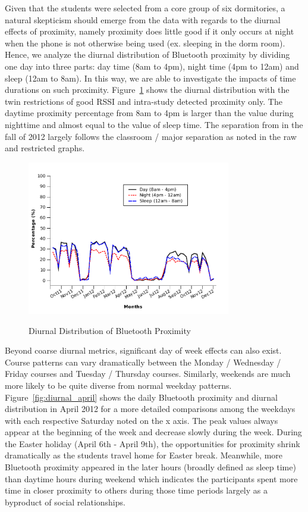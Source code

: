 Given that the students were selected from a core group of six dormitories, a natural skepticism should emerge from the data with regards to the diurnal effects of proximity, namely proximity does little good if it only occurs at night when the phone is not otherwise being used (ex. sleeping in the dorm room).  Hence, we analyze the diurnal distribution of Bluetooth proximity by dividing one day into three parts: day time (8am to 4pm), night time (4pm to 12am) and sleep (12am to 8am). In this way, we are able to investigate the impacts of time durations on such proximity. Figure~\ref{fig:diurnal} shows the diurnal distribution with the twin restrictions of good RSSI and intra-study detected proximity only. The daytime proximity percentage from 8am to 4pm is larger than the value during nighttime and almost equal to the value of sleep time.  The separation from in the fall of 2012 largely follows the classroom / major separation as noted in the raw and restricted graphs. 

\begin{figure}[tbp]
\centering 
{\includegraphics[width=3.5in]{graphs/weekly_bluetooth_diurnal.pdf}}
 \caption{Diurnal Distribution of Bluetooth Proximity} 
\label{fig:diurnal}
\end{figure} 

Beyond coarse diurnal metrics, significant day of week effects can also exist. Course patterns can vary dramatically between the Monday / Wednesday / Friday courses and Tuesday / Thursday courses.  Similarly, weekends are much more likely to be quite diverse from normal weekday patterns.  Figure~\ref{fig:diurnal_april} shows the daily Bluetooth proximity and diurnal distribution in April 2012 for a more detailed comparisons among the weekdays with each respective Saturday noted on the x axis. The peak values always appear at the beginning of the week and decrease slowly during the week. During the Easter holiday (April 6th - April 9th), the opportunities for proximity shrink dramatically as the students travel home for Easter break. Meanwhile, more Bluetooth proximity appeared in the later hours (broadly defined as sleep time) than daytime hours during weekend which indicates the participants spent more time in closer proximity to others during those time periods largely as a byproduct of social relationships. 

